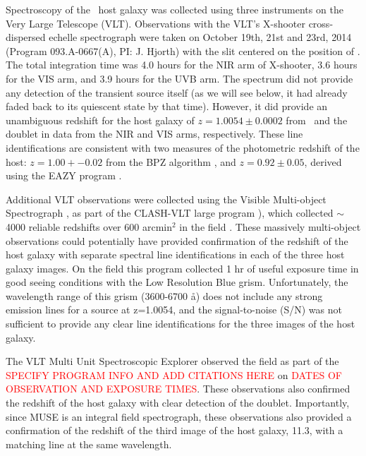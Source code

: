 Spectroscopy of the \spock\ host galaxy was collected using
three instruments on the Very Large Telescope (VLT).   Observations with the VLT's
X-shooter cross-dispersed echelle spectrograph \citep{Vernet:2011}
were taken on October 19th, 21st and 23rd, 2014 (Program
093.A-0667(A), PI: J. Hjorth) with the slit centered on the position
of .  The total integration time was 4.0 hours for the NIR arm
of X-shooter, 3.6 hours for the VIS arm, and 3.9 hours for the UVB
arm.  The spectrum did not provide any detection of the transient
source itself (as we will see below, it had already faded back to its
quiescent state by that time).  However, it did provide an unambiguous
redshift for the host galaxy of $z=1.0054\pm0.0002$ from \Ha\ and the
 doublet in data from the NIR and VIS arms,
respectively.  These line identifications are consistent with two
measures of the photometric redshift of the host: $z=1.00+-0.02$ from
the BPZ algorithm \citep{Benitez:2000}, and $z=0.92\pm0.05$, derived
using the EAZY program \citep{Brammer:2008}.

Additional VLT observations were collected using the Visible Multi-object
Spectrograph \citep[VIMOS][]{LeFevre:2003}, as part of the CLASH-VLT large
program \citep[Program 186.A-0.798; P.I.: P. Rosati;][]{Rosati:2014}),
which collected $\sim$4000 reliable redshifts over 600 arcmin$^2$ in
the  field \citep{Grillo:2015a,Balestra:2015}.  These
massively multi-object observations could potentially have provided
confirmation of the redshift of the \spock host galaxy with separate
spectral line identifications in each of the three host galaxy images.
On the  field this program collected 1 hr of useful exposure
time in good seeing conditions with the Low Resolution Blue grism.
Unfortunately, the wavelength range of this grism (3600-6700 \aa) does
not include any strong emission lines for a source at z=1.0054, and
the signal-to-noise (S/N) was not sufficient to provide any clear line
identifications for the three images of the \spock host galaxy.

The VLT Multi Unit Spectroscopic Explorer
\citep[MUSE;][]{Henault:2003,Bacon:2012} observed the  field
as part of the \textcolor{red}{SPECIFY PROGRAM INFO AND ADD CITATIONS
  HERE} on \textcolor{red}{DATES OF OBSERVATION AND EXPOSURE TIMES}.
These observations also confirmed the redshift of the host galaxy with
clear detection of the  doublet.  Importantly, since
MUSE is an integral field spectrograph, these observations also
provided a confirmation of the redshift of the third image of the host
galaxy, 11.3, with a matching  line at the same
wavelength.

